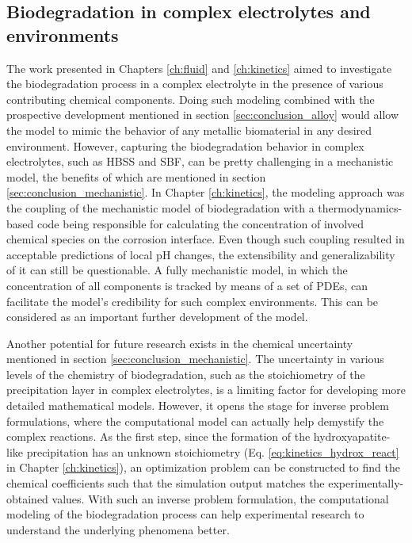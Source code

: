 \subsection{Biodegradation in complex electrolytes and environments}

The work presented in Chapters \ref{ch:fluid} and \ref{ch:kinetics} aimed to investigate the biodegradation process in a complex electrolyte in the presence of various contributing chemical components. Doing such modeling combined with the prospective development mentioned in section \ref{sec:conclusion_alloy} would allow the model to mimic the behavior of any metallic biomaterial in any desired environment. However, capturing the biodegradation behavior in complex electrolytes, such as \gls{HBSS} and \gls{SBF}, can be pretty challenging in a mechanistic model, the benefits of which are mentioned in section \ref{sec:conclusion_mechanistic}. In Chapter \ref{ch:kinetics}, the modeling approach was the coupling of the mechanistic model of biodegradation with a thermodynamics-based code being responsible for calculating the concentration of involved chemical species on the corrosion interface. Even though such coupling resulted in acceptable predictions of local pH changes, the extensibility and generalizability of it can still be questionable. A fully mechanistic model, in which the concentration of all components is tracked by means of a set of \gls{PDE}s, can facilitate the model's credibility for such complex environments. This can be considered as an important further development of the model.

Another potential for future research exists in the chemical uncertainty mentioned in section \ref{sec:conclusion_mechanistic}. The uncertainty in various levels of the chemistry of biodegradation, such as the stoichiometry of the precipitation layer in complex electrolytes, is a limiting factor for developing more detailed mathematical models. However, it opens the stage for inverse problem formulations, where the computational model can actually help demystify the complex reactions. As the first step, since the formation of the hydroxyapatite-like precipitation has an unknown stoichiometry (Eq. \ref{eq:kinetics_hydrox_react} in Chapter \ref{ch:kinetics}), an optimization problem can be constructed to find the chemical coefficients such that the simulation output matches the experimentally-obtained values. With such an inverse problem formulation, the computational modeling of the biodegradation process can help experimental research to understand the underlying phenomena better.

